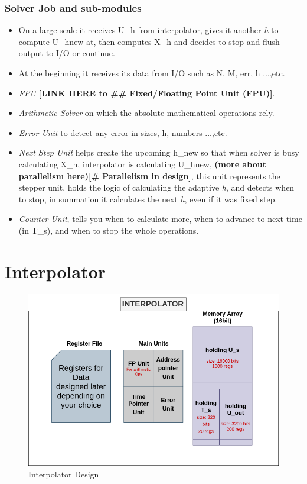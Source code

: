\documentclass[12pt]{report}
\begin{document}
\subsubsection{Solver Job and sub-modules}
\begin{itemize}
    \item On a large scale it receives U\_h from interpolator, gives it another \emph{h} to compute U\_hnew at, then computes X\_h and decides to stop and flush output to I/O or continue.
    \item At the beginning it receives its data from I/O such as N, M, err, h ...,etc.
    \item \emph{FPU} \textbf{[LINK HERE to \#\# Fixed/Floating Point Unit (FPU)]}.
    \item \emph{Arithmetic Solver} on which the absolute mathematical operations rely.
    \item \emph{Error Unit} to detect any error in sizes, h, numbers ...,etc.
    \item \emph{Next Step Unit} helps create the upcoming h\_new so that when solver is busy calculating X\_h, interpolator is calculating U\_hnew, \textbf{(more about parallelism here)[\# Parallelism in design]}, this unit represents the stepper unit, holds the logic of calculating the adaptive \emph{h}, and detects when to stop, in summation it calculates the next \emph{h}, even if it was fixed step.
    \item \emph{Counter Unit}, tells you when to calculate more, when to advance to next time (in T\_s), and when to stop the whole operations.
\end{itemize}

\section{Interpolator}

\begin{figure}[hp]
    \centering
    \includegraphics[width=\textwidth]{interpolator}
    \caption{Interpolator Design}
    \label{fig:interpolator}
\end{figure}
\end{document}
